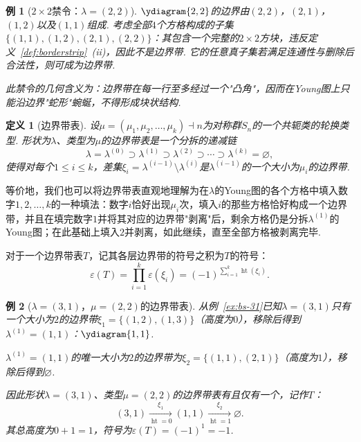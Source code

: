 \documentclass{sjtureport}
\newtheorem{definition}{定义}[chapter]
\newtheorem{example}{例}[chapter]
\begin{document}
\begin{example}[$2\times2$禁令：$\lambda=(2,2)$]\label{ex:bs-22}
    $\ydiagram{2,2}$的边界由$(2,2)$，$(2,1)$，$(1,2)$以及$(1,1)$组成. 考虑全部$4$个方格构成的子集$\{(1,1),(1,2),(2,1),(2,2)\}$：其包含一个完整的$2\times2$方块，违反定义~\ref{def:borderstrip}~(ii)，因此\emph{不是}边界带. 它的任意真子集若满足连通性与删除后合法性，则可成为边界带. 

    此禁令的几何含义为：边界带在每一行至多经过一个"凸角"，因而在Young图上只能沿边界"蛇形"蜿蜒，不得形成块状结构. 
\end{example}


\begin{definition}[边界带表]\label{def:bst}
    设$\mu=(\mu_1,\mu_2,\dots,\mu_k)\dashv n$为对称群$S_n$的一个共轭类的轮换类型. 形状为$\lambda$、类型为$\mu$的\emph{边界带表}是一个分拆的递减链
    \begin{equation*}
        \lambda = \lambda^{(0)} \supset \lambda^{(1)} \supset \lambda^{(2)} \supset \cdots \supset \lambda^{(k)} = \varnothing,
    \end{equation*}
    使得对每个$1\le i\le k$，差集$\xi_i = \lambda^{(i-1)}\setminus\lambda^{(i)}$是$\lambda^{(i-1)}$的一个大小为$\mu_i$的边界带. 
\end{definition}

等价地，我们也可以将边界带表直观地理解为在$\lambda$的Young图的各个方格中填入数字$1,2,\dots,k$的一种填法：数字$i$恰好出现$\mu_i$次，填入$i$的那些方格恰好构成一个边界带，并且在填完数字$1$并将其对应的边界带"剥离"后，剩余方格仍是分拆$\lambda^{(1)}$的Young图；在此基础上填入$2$并剥离，如此继续，直至全部方格被剥离完毕. 

对于一个边界带表$T$，记其各层边界带的符号之积为$T$的符号：
\begin{equation*}
    \varepsilon(T) = \prod_{i=1}^{k} \varepsilon(\xi_i) = (-1)^{\sum_{i=1}^{k}\operatorname{ht}(\xi_i)}.
\end{equation*}

\begin{example}[$\lambda=(3,1)$，$\mu=(2,2)$的边界带表]\label{ex:bst-31-22}
    从例~\ref{ex:bs-31}已知$\lambda=(3,1)$只有一个大小为$2$的边界带$\xi_1=\{(1,2),(1,3)\}$（高度为$0$），移除后得到$\lambda^{(1)}=(1,1)$：$\ydiagram{1,1}$. \par
    $\lambda^{(1)}=(1,1)$的唯一大小为$2$的边界带为$\xi_2=\{(1,1),(2,1)\}$（高度为$1$），移除后得到$\varnothing$. \par
    因此形状$\lambda=(3,1)$、类型$\mu=(2,2)$的边界带表有且仅有一个，记作$T$：
    \begin{equation*}
        (3,1) \xrightarrow[\operatorname{ht}=0]{\xi_1} (1,1) \xrightarrow[\operatorname{ht}=1]{\xi_2} \varnothing.
    \end{equation*}
    其总高度为$0+1=1$，符号为$\varepsilon(T)=(-1)^{1}=-1$. 
\end{example}
\end{document}
